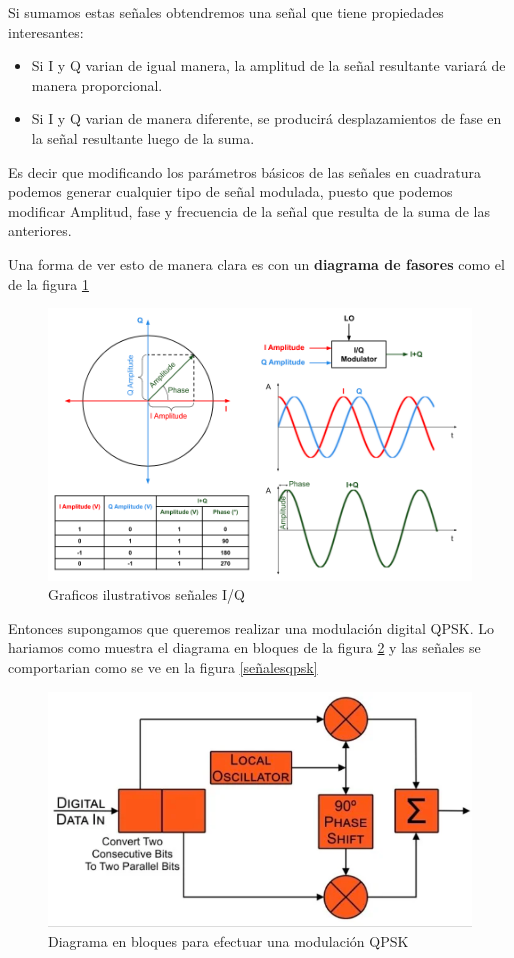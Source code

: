 \documentclass[a4paper,12pt]{report} %
\begin{document}
Si sumamos estas señales obtendremos una señal que tiene propiedades interesantes: 

\begin{itemize}
	\item Si I y Q varian de igual manera, la amplitud de la señal resultante variará de manera proporcional.
	\item Si I y Q varian de manera diferente, se producirá desplazamientos de fase en la señal resultante luego de la suma.
\end{itemize}

Es decir que modificando los parámetros básicos de las señales en cuadratura podemos generar cualquier tipo de señal modulada, puesto que podemos modificar Amplitud, fase y frecuencia de la señal que resulta de la suma de las anteriores.

Una forma de ver esto de manera clara es con un \textbf{diagrama de fasores} como el de la figura \ref{fasores}

\begin{figure}[H]
	\centering
	\includegraphics[scale=0.5]{Imagenes/Arquitectura/fasores}
	\caption{Graficos ilustrativos señales I/Q}
	\label{fasores}
\end{figure}

Entonces supongamos que queremos realizar una modulación digital QPSK. Lo hariamos como muestra el diagrama en bloques de la figura \ref{QPSK} y las señales se comportarian como se ve en la figura \ref{señalesqpsk}

\begin{figure}[H]
	\centering
	\includegraphics[scale=0.5]{Imagenes/Arquitectura/QPSK}
	\caption{Diagrama en bloques para efectuar una modulación QPSK }
	\label{QPSK}
\end{figure}
\end{document}

